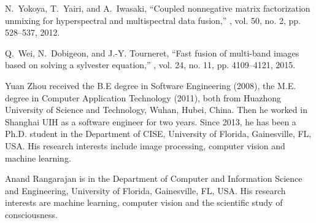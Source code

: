 \documentclass[twocolumn,english]{IEEEtran}
\theoremstyle{plain}
\begin{document}
\begin{thebibliography}{10}
N.~Yokoya, T.~Yairi, and A.~Iwasaki,
\newblock ``Coupled nonnegative matrix factorization unmixing for hyperspectral
  and multispectral data fusion,''
, vol. 50,
  no. 2, pp. 528--537, 2012.

Q.~Wei, N.~Dobigeon, and J.-Y. Tourneret,
\newblock ``Fast fusion of multi-band images based on solving a sylvester
  equation,''
, vol. 24, no. 11, pp.
  4109--4121, 2015.

\end{thebibliography}
\begin{IEEEbiography}{Yuan Zhou}
 received the B.E degree in Software Engineering (2008), the M.E.
degree in Computer Application Technology (2011), both from Huazhong
University of Science and Technology, Wuhan, Hubei, China. Then he
worked in Shanghai UIH as a software engineer for two years. Since
2013, he has been a Ph.D. student in the Department of CISE, University
of Florida, Gainesville, FL, USA. His research interests include image
processing, computer vision and machine learning.
\end{IEEEbiography}

\begin{IEEEbiography}{Anand Rangarajan}
 is in the Department of Computer and Information Science and Engineering,
University of Florida, Gainesville, FL, USA. His research interests
are machine learning, computer vision and the scientific study of
consciousness.
\end{IEEEbiography}
\end{document}
